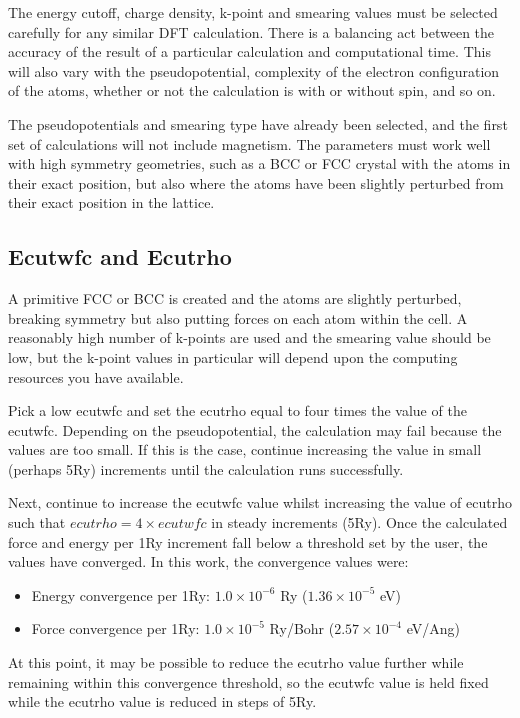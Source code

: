 The energy cutoff, charge density, k-point and smearing values must be selected carefully for any similar DFT calculation.  There is a balancing act between the accuracy of the result of a particular calculation and computational time.  This will also vary with the pseudopotential, complexity of the electron configuration of the atoms, whether or not the calculation is with or without spin, and so on.

The pseudopotentials and smearing type have already been selected, and the first set of calculations will not include magnetism.  The parameters must work well with high symmetry geometries, such as a BCC or FCC crystal with the atoms in their exact position, but also where the atoms have been slightly perturbed from their exact position in the lattice.

\subsection{Ecutwfc and Ecutrho}

A primitive FCC or BCC is created and the atoms are slightly perturbed, breaking symmetry but also putting forces on each atom within the cell.  A reasonably high number of k-points are used and the smearing value should be low, but the k-point values in particular will depend upon the computing resources you have available.

Pick a low ecutwfc and set the ecutrho equal to four times the value of the ecutwfc.  Depending on the pseudopotential, the calculation may fail because the values are too small.  If this is the case, continue increasing the value in small (perhaps 5Ry) increments until the calculation runs successfully.

Next, continue to increase the ecutwfc value whilst increasing the value of ecutrho such that $ecutrho = 4 \times ecutwfc$ in steady increments (5Ry).  Once the calculated force and energy per 1Ry increment fall below a threshold set by the user, the values have converged.  In this work, the convergence values were:

\begin{itemize}
\item Energy convergence per 1Ry: $1.0 \times 10^{-6}$ Ry ($1.36 \times 10^{-5}$ eV)
\item Force convergence per 1Ry: $1.0 \times 10^{-5}$ Ry/Bohr ($2.57 \times 10^{-4}$ eV/Ang)
\end{itemize}

At this point, it may be possible to reduce the ecutrho value further while remaining within this convergence threshold, so the ecutwfc value is held fixed while the ecutrho value is reduced in steps of 5Ry.

